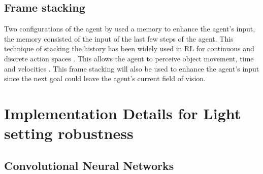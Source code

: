 \subsection{Frame stacking}

Two configurations of the agent by \autocite{maximilian} used a memory to enhance the agent's input, the memory consisted of the input of the last few steps of the agent. This technique of stacking the history has been widely used in RL for continuous \autocite{atari} and discrete action spaces \autocite{alphago}. This allows the agent to perceive object movement, time and velocities \autocite{atari}.
This frame stacking will also be used to enhance the agent's input since the next goal could leave the agent's current field of vision.





\section{Implementation Details for Light setting robustness} \label{light_setting_robustness}

\subsection{Convolutional Neural Networks}

